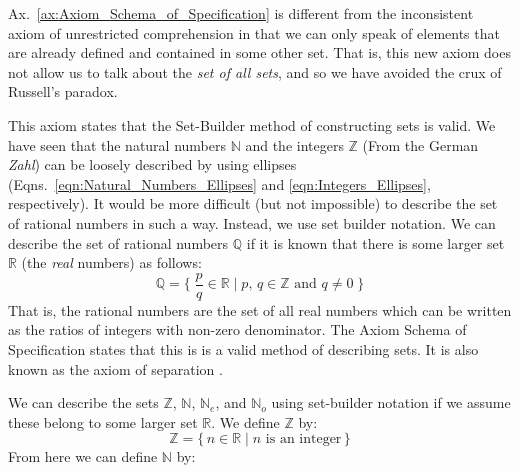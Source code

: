         Ax.~\ref{ax:Axiom_Schema_of_Specification} is different from the
        inconsistent axiom of unrestricted comprehension%
         in that we can only speak of
        elements that are already defined and contained in some other set. That
        is, this new axiom does not allow us to talk about the
        \textit{set of all sets}, and so we have avoided
        the crux of Russell's paradox.
        \par\hfill\par
        This axiom states that the Set-Builder method of constructing sets is
        valid. We have seen that the natural numbers $\mathbb{N}$ and the
        integers $\mathbb{Z}$ (From the German \textit{Zahl}) can be loosely
        described by using ellipses (Eqns.~\ref{eqn:Natural_Numbers_Ellipses}
        and \ref{eqn:Integers_Ellipses}, respectively). It would be more
        difficult (but not impossible) to describe the set of rational numbers%
         in such a way. Instead, we use set builder
        notation. We can describe the set of rational numbers $\mathbb{Q}$ if it
        is known that there is some larger set $\mathbb{R}$
        (the \textit{real} numbers) as follows:
        \begin{equation}
            \mathbb{Q}=\Big\{\;\frac{p}{q}\in\mathbb{R}\;\big|\;
                                p,\,q\in\mathbb{Z}\textrm{ and }q\ne{0}\;\Big\}
        \end{equation}
        That is, the rational numbers are the set of all real numbers which can
        be written as the ratios of integers with non-zero denominator. The
        Axiom Schema of Specification states that this is is a valid method of
        describing sets. It is also known as the axiom of separation%
        .
        \par\hfill\par
        We can describe the sets $\mathbb{Z}$, $\mathbb{N}$, $\mathbb{N}_{e}$,
        and $\mathbb{N}_{o}$ using set-builder notation if we assume these
        belong to some larger set $\mathbb{R}$. We define $\mathbb{Z}$ by:
        \begin{equation}
            \mathbb{Z}=
            \big\{\,n\in\mathbb{R}\;|\;n\textrm{ is an integer}\,\big\}
        \end{equation}
        From here we can define $\mathbb{N}$ by:
